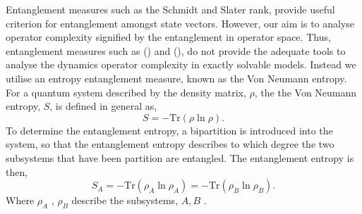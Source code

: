 Entanglement measures such as the Schmidt and Slater rank, provide useful criterion for entanglement amongst state vectors. However, our aim is to analyse operator complexity signified by the entanglement in operator space. Thus, entanglement measures such as () and (), do not provide the adequate tools to analyse the dynamics operator complexity in exactly solvable models. Instead we utilise an entropy entanglement measure, known as the Von Neumann entropy. For a quantum system described by the density matrix, $\rho$, the the Von Neumann entropy, $S$, is defined in general as, 
\begin{equation}
    S = -\text{Tr}(\rho \ln \rho).
\end{equation}
To determine the entanglement entropy, a bipartition is introduced into the system, so that the entanglement entropy describes to which degree the two subsystems that have been partition are entangled. The entanglement entropy is then, 
\begin{equation}\label{entrop}
    S_A = -\text{Tr}(\rho_A \ln \rho_A) = -\text{Tr}(\rho_B \ln \rho_B).
\end{equation}
Where $\rho_A$ , $\rho_B$ describe the subsystems, $A, B$ \cite{PhysRevA.51.2738}.
















% 

